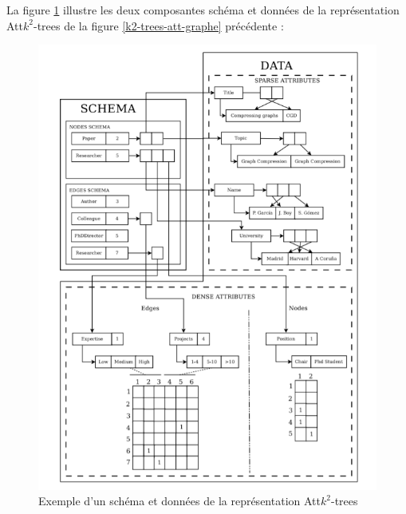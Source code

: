\begin{itemize}
\begin{description}
\end{description}
La figure \ref{k2-trees-att-schema} illustre les deux composantes schéma et données de la représentation Att$k^2$-trees  de la figure \ref{k2-trees-att-graphe} précédente \citep{alvarez2018compact}:
\begin{figure}[H]
\begin{center}
\includegraphics[height=200 pt, width=280 pt]{./ressources/image/k2-trees-att-schema.png} 
\end{center}
\caption{Exemple d'un schéma et données de la représentation Att$k^2$-trees}
\label{k2-trees-att-schema}
\end{figure}



\end{itemize}
